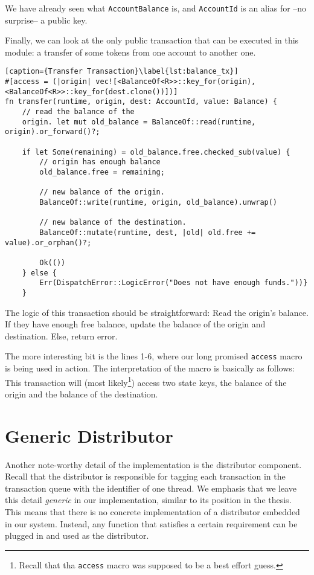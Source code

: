 We have already seen what \texttt{AccountBalance} is, and \texttt{AccountId} is an alias for --no
surprise-- a public key.

Finally, we can look at the only public transaction that can be executed in this module: a transfer
of some tokens from one account to another one.

\begin{lstlisting}[caption={Transfer Transaction}\label{lst:balance_tx}]
#[access = (|origin| vec![<BalanceOf<R>>::key_for(origin), <BalanceOf<R>>::key_for(dest.clone())])]
fn transfer(runtime, origin, dest: AccountId, value: Balance) {
	// read the balance of the
	origin. let mut old_balance = BalanceOf::read(runtime, origin).or_forward()?;

	if let Some(remaining) = old_balance.free.checked_sub(value) {
		// origin has enough balance
		old_balance.free = remaining;

		// new balance of the origin.
		BalanceOf::write(runtime, origin, old_balance).unwrap()

		// new balance of the destination.
		BalanceOf::mutate(runtime, dest, |old| old.free += value).or_orphan()?;

		Ok(())
	} else {
		Err(DispatchError::LogicError("Does not have enough funds."))}
	}
\end{lstlisting}

The logic of this transaction should be straightforward: Read the origin's balance. If they have
enough free balance, update the balance of the origin and destination. Else, return error.

The more interesting bit is the lines 1-6, where our long promised \texttt{access} macro is being
used in action. The interpretation of the macro is basically as follows: This transaction will (most
likely\footnote{Recall that tha \texttt{access} macro was supposed to be a best effort guess.})
access two state keys, the balance of the origin and the balance of the destination.

\section{Generic Distributor}

Another note-worthy detail of the implementation is the distributor component. Recall that the
distributor is responsible for tagging each transaction in the transaction queue with the identifier
of one thread. We emphasis that we leave this detail \textit{generic} in our implementation, similar
to its position in the thesis. This means that there is no concrete implementation of a distributor
embedded in our system. Instead, any function that satisfies a certain requirement can be plugged
in and used as the distributor.

